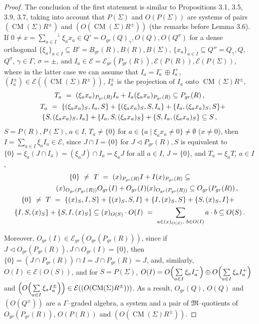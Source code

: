 \documentclass[a4paper,11pt]{article}
\DeclareMathOperator{\CM}{CM}
\begin{document}
\begin{proof}
The conclusion of the first statement is similar to Propositions 
3.1, 3.5, 3.9, 3.7, taking into account that $P(\Sigma)$ and 
$O(P(\Sigma))$ are systems of pairs $(\CM(\Sigma) R^{\pm})$ and 
$(O(\CM(\Sigma) R^{\pm}))$ (the remarks before Lemma 3.6). 
If ${0\ne x={\sum\limits_{a\in I}}^{\perp} \xi_a x_a\in 
Q'=O_{gr}(Q)_{\gamma}, O(Q), O(Q^{\sigma})}$ for a dense orthogonal 
${\{\xi_a\}_{a\in I}\subseteq B'=B_{gr}(R), B(R), B(\Sigma)}$, 
${\{x_a\}_{a\in I}\subseteq Q''=Q_{\gamma}, Q}$, $Q^{\sigma}$, 
${\gamma\in \Gamma}$, ${\sigma=\pm}$, and 
${I_a\in \mathcal{E}=\mathcal{E}_{gr}(P_{gr}(R)), \mathcal{E}(P(R)), 
\mathcal{E}(P(\Sigma))}$, where in the latter case we can assume 
that ${I_a=I_a^{-}\oplus I_a^{+}}$, 
${(I_a^{\pm})\in \mathcal{E}((\CM(\Sigma) R^{\pm}))}$, 
$I_a^{\pm}$ is the projection of $I_a$ onto $\CM(\Sigma) R^{\pm}$, 
\begin{multline*}
T_a\ =\ 
(\xi_a x_a)_{P_{gr}(R)} I_a+I_a (\xi_a x_a)_{P_{gr}(R)}\subseteq P_{gr}(R)\,,
\\
\shoveleft{
T_a\ =\ \{(\xi_a x_a)_S, I_a, S\}+\{(\xi_a x_a)_S, S, I_a\}+
\{I_a, (\xi_a x_a)_S, S\}+}
\\ 
\{S, (\xi_a x_a)_S, I_a\}+
\{I_a, S, (\xi_a x_a)_S\}+\{S, I_a, (\xi_a x_a)_S\}\subseteq S\,,
\end{multline*}
${S=P(R), P(\Sigma)}$, ${a\in I}$, ${T_a\ne \{0\}}$ for 
${a\in \{a\mid \xi_a x_a\ne 0\}\ne \emptyset}$ (${x\ne 0}$), 
then ${I=\sum\limits_{a\in I} \xi_a I_a\in \mathcal{E}}$, since 
${J\cap I=\{0\}}$ for ${J\lhd P_{gr}(R), S}$ is equivalent to 
${\{0\}=\xi_a (J\cap I_a)=(\xi_a J)\cap I_a=\xi_a J}$ for all ${a\in I}$,
${J=\{0\}}$, and ${T_a=\xi_a T}$, ${a\in I}$,
\begin{multline*}
\{0\}\ \ne\ T\ =\ (x)_{P_{gr}(R)} I+I (x)_{P_{gr}(R)}\subseteq 
\\
\shoveright{
(x)_{O_{gr}(P_{gr}(R))} O_{gr}(I)+O_{gr}(I) (x)_{O_{gr}(P_{gr}(R))}
\subseteq O_{gr}(P_{gr}(R))\,,}
\\
\shoveleft{
\{0\}\ \ne\ T\ =\ \{(x)_S, I, S\}+\{(x)_S, S, I\}+\{I, (x)_S, S\}+ 
\{S, (x)_S, I\}+}
\\ 
\{I, S, (x)_S\}+\{S, I, (x)_S\}\subseteq 
(x)_{O(S)}\cdot O(I)\ =\ \sum_{a\in (x)_{O(S)},\ b\in O(I)} a\cdot b\subseteq O(S)\,.
\end{multline*}

Moreover, ${O_{gr}(I)\in \mathcal{E}_{gr}(O_{gr}(P_{gr}(R)))}$, since if 
${J\lhd O_{gr}(P_{gr}(R)), J\cap O_{gr}(I)=\{0\}}$, then  
${\{0\}=(J\cap P_{gr}(R))\cap I=J\cap P_{gr}(R)=J}$, and, similarly, 
${O(I)\in \mathcal{E}(O(S))}$, and for ${S=P(\Sigma)}$, 
${O(I)=O\Bigl(\sum\limits_{a\in I} \xi_a I_a^{-}\Bigr)\oplus 
O\Bigl(\sum\limits_{a\in I} \xi_a I_a^{+}\Bigr)}$ and 
${\Bigl(O\Bigl(\sum\limits_{a\in I} \xi_a I_a^{\pm}\Bigr)\Bigr)\in 
\mathcal{E}((O(\CM(\Sigma) R^{\pm})))}$. As a result, 
$O_{gr}(Q)$, $O(Q)$ and $(O(Q^{\pm}))$ are a $\Gamma$--graded algebra, 
a system and a pair of $\mathfrak{M}$--quotients of $O_{gr}(P_{gr}(R))$, 
$O(P(R))$ and $(O(\CM(\Sigma) R^{\pm}))$.


\end{proof}
\end{document}
